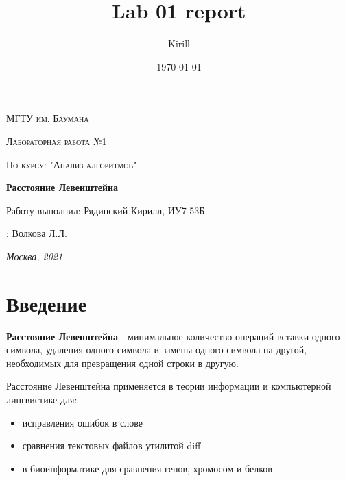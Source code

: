 \documentclass[12pt]{report}
\title{Lab 01 report}
\author{Kirill}
\date{\today}
\begin{document}
\begin{titlepage}
	\centering
	{\scshape\LARGE МГТУ им. Баумана \par}
	\vspace{3cm}
	{\scshape\Large Лабораторная работа №1\par}
	\vspace{0.5cm}	
	{\scshape\Large По курсу: "Анализ алгоритмов"\par}
	\vspace{1.5cm}
	{\huge\bfseries Расстояние Левенштейна\par}
	\vspace{2cm}
	\Large Работу выполнил: Рядинский Кирилл, ИУ7-53Б\par
	\vspace{0.5cm}
	:  Волкова Л.Л. \par
	
	\vfill
	\large \textit {Москва, 2021} \par
\end{titlepage}


\tableofcontents
\newpage

\chapter*{Введение}
	
\textbf{Расстояние Левенштейна} - минимальное количество операций вставки одного символа, удаления одного символа и замены одного символа на другой, необходимых для превращения одной строки в другую.

Расстояние Левенштейна применяется в теории информации и компьютерной лингвистике для:

\begin{itemize}
	\item исправления ошибок в слове
	\item сравнения текстовых файлов утилитой diff
	\item в биоинформатике для сравнения генов, хромосом и белков
\end{itemize}
\end{document}

